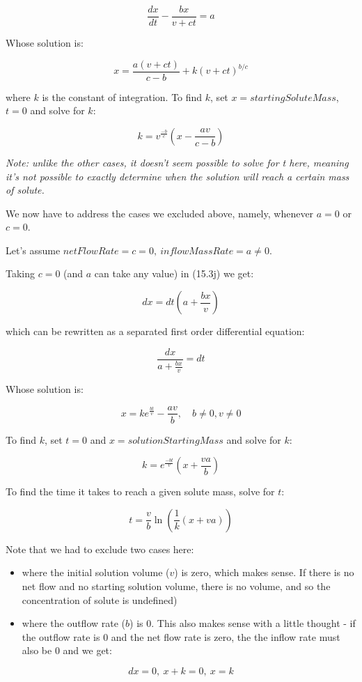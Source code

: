 \documentclass{article}
\begin{document}
\[ \frac{dx}{dt} - \frac{bx}{v+ct} = a \]

Whose solution is:

\[ x = \frac{a(v+ct)}{c-b} + k(v+ct)^{b/c} \]

where $k$ is the constant of integration. To find $k$, set $x = startingSoluteMass$, $t = 0$ and solve for $k$:

\[ k = v^{\frac{-b}{c}}(x - \frac{av}{c-b}) \]

\emph{Note: unlike the other cases, it doesn't seem possible to solve for t here, meaning it's not possible to exactly determine when the solution will reach a certain mass of solute.}

We now have to address the cases we excluded above, namely, whenever $a = 0$ or $c = 0$.

Let's assume $netFlowRate = c = 0,~inflowMassRate = a \neq 0$.

Taking $c = 0$ (and $a$ can take any value) in (15.3j) we get:

\[ dx = dt(a+\frac{bx}{v}) \]

which can be rewritten as a separated first order differential equation:

\[ \frac{dx}{a+\frac{bx}{v}} = dt \]

Whose solution is:

\[ x = ke^{\frac{bt}{v}}-\frac{av}{b}, \quad b \neq 0, v \neq 0 \]

To find $k$, set $t = 0$ and $x = solutionStartingMass$ and solve for $k$:

\[ k = e^{\frac{-bt}{v}}(x + \frac{va}{b}) \]

To find the time it takes to reach a given solute mass, solve for $t$:

\[ t = \frac{v}{b}\ln({\frac{1}{k}(x+va)}) \]

Note that we had to exclude two cases here:

\begin{itemize}
\item where the initial solution volume ($v$) is zero, which makes sense. If there is no net flow and no starting solution volume, there is no volume, and so the concentration of solute is undefined)
\item where the outflow rate ($b$) is 0. This also makes sense with a little thought - if the outflow rate is 0 and the net flow rate is zero, the the inflow rate must also be 0 and we get:
\end{itemize}

\[ dx = 0,~x+k =0,~x = k \]
\end{document}
